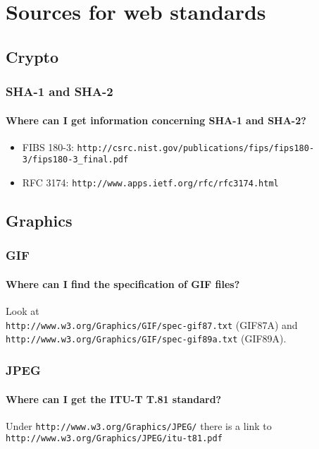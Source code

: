 \documentclass[10pt]{scrbook}
\begin{document}
\section{Sources for web standards}

\subsection{Crypto}

\subsubsection{SHA-1 and SHA-2}

\paragraph{Where can I get information concerning SHA-1 and SHA-2?}
\begin{itemize}
\item FIBS 180-3: \verb|http://csrc.nist.gov/publications/fips/fips180-3/fips180-3_final.pdf|
\item RFC 3174: \verb|http://www.apps.ietf.org/rfc/rfc3174.html|
\end{itemize}

\subsection{Graphics}

\subsubsection{GIF}

\paragraph{Where can I find the specification of GIF files?}
Look at \\
\verb|http://www.w3.org/Graphics/GIF/spec-gif87.txt| (GIF87A) and \\
\verb|http://www.w3.org/Graphics/GIF/spec-gif89a.txt| (GIF89A).

\subsubsection{JPEG}

\paragraph{Where can I get the ITU-T T.81 standard?} Under \verb|http://www.w3.org/Graphics/JPEG/| there is a link to \verb|http://www.w3.org/Graphics/JPEG/itu-t81.pdf|
\end{document}
